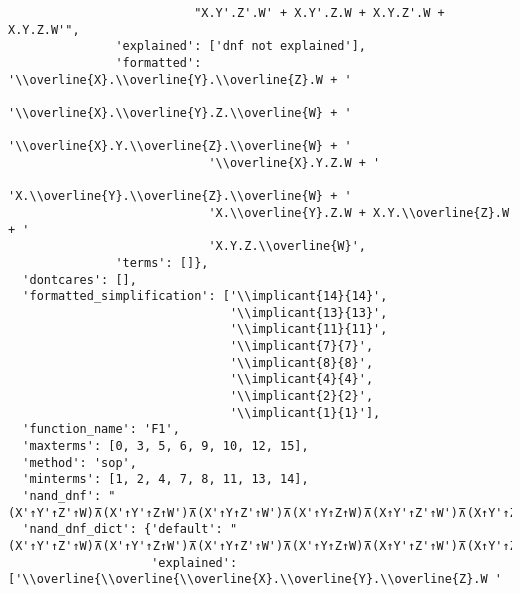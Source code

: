 \begin{verbatim}
                          "X.Y'.Z'.W' + X.Y'.Z.W + X.Y.Z'.W + X.Y.Z.W'",
               'explained': ['dnf not explained'],
               'formatted': '\\overline{X}.\\overline{Y}.\\overline{Z}.W + '
                            '\\overline{X}.\\overline{Y}.Z.\\overline{W} + '
                            '\\overline{X}.Y.\\overline{Z}.\\overline{W} + '
                            '\\overline{X}.Y.Z.W + '
                            'X.\\overline{Y}.\\overline{Z}.\\overline{W} + '
                            'X.\\overline{Y}.Z.W + X.Y.\\overline{Z}.W + '
                            'X.Y.Z.\\overline{W}',
               'terms': []},
  'dontcares': [],
  'formatted_simplification': ['\\implicant{14}{14}',
                               '\\implicant{13}{13}',
                               '\\implicant{11}{11}',
                               '\\implicant{7}{7}',
                               '\\implicant{8}{8}',
                               '\\implicant{4}{4}',
                               '\\implicant{2}{2}',
                               '\\implicant{1}{1}'],
  'function_name': 'F1',
  'maxterms': [0, 3, 5, 6, 9, 10, 12, 15],
  'method': 'sop',
  'minterms': [1, 2, 4, 7, 8, 11, 13, 14],
  'nand_dnf': "(X'↑Y'↑Z'↑W)⊼(X'↑Y'↑Z↑W')⊼(X'↑Y↑Z'↑W')⊼(X'↑Y↑Z↑W)⊼(X↑Y'↑Z'↑W')⊼(X↑Y'↑Z↑W)⊼(X↑Y↑Z'↑W)⊼(X↑Y↑Z↑W')",
  'nand_dnf_dict': {'default': "(X'↑Y'↑Z'↑W)⊼(X'↑Y'↑Z↑W')⊼(X'↑Y↑Z'↑W')⊼(X'↑Y↑Z↑W)⊼(X↑Y'↑Z'↑W')⊼(X↑Y'↑Z↑W)⊼(X↑Y↑Z'↑W)⊼(X↑Y↑Z↑W')",
                    'explained': ['\\overline{\\overline{\\overline{X}.\\overline{Y}.\\overline{Z}.W '

\end{verbatim}
